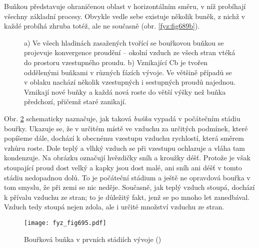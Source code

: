     Buňkou představuje ohraničenou oblast v horizontálním směru, v níž probíhají všechny základní
    procesy. Obvykle vedle sebe existuje několik buněk, z nichž v každé probíhá zhruba totéž, ale ne
    současně (obr. \ref{fyz:fig689b}). 

    \begin{figure}[ht!]
      \centering
                  \hspace{1em}
      \caption{a) Ve všech hladinách zasažených tvořící se bouřkovou buňkou se projevuje 
              konvergence proudění – okolní vzduch ze všech stran vtéká do prostoru vzestupného 
              proudu. b) Vznikající Cb je tvořen oddělenými buňkami v různých fázích 
              vývoje. Ve většině případů se v oblaku nachází několik vzestupných i sestupných 
              proudů najednou. Vznikají nové buňky a každá nová roste do větší výšky než buňka 
              předchozí, přičemž staré zanikají.}
      \label{fyz:fig937}
    \end{figure}
    
    Obr. \ref{fyz:fig695} schematicky naznačuje, jak taková \emph{buňka} vypadá v počátečním stádiu
    bouřky. Ukazuje se, že v určitém místě ve vzduchu za určitých podmínek, které popíšeme dále,
    dochází k obecnému vzestupu vzduchu rychlostí, která směrem vzhůru roste. Dole teplý a vlhký
    vzduch se při vzestupu ochlazuje a vláha tam kondenzuje. Na obrázku označují hvězdičky sníh a
    kroužky déšť. Protože je však stoupající proud dost velký a kapky jsou dost malé, ani sníh ani
    déšť v tomto stádiu nedopadnou dolů. To je počáteční stádium a ještě ne opravdová bouřka v tom
    smyslu, že při zemi se nic neděje. Současně, jak teplý vzduch stoupá, dochází k přívalu vzduchu
    ze stran; to je důležitý fakt, jenž se po mnoho let zanedbával. Vzduch tedy stoupá nejen zdola,
    ale i určité množství vzduchu ze stran.    

    \begin{figure}[ht!] %
      \centering
      \texttt{[image: fyz\_fig695.pdf]}
      \caption{Bouřková buňka v prvních stádiích vývoje (\cite[s.~707]{Feynman02})}
      \label{fyz:fig695}
    \end{figure}

